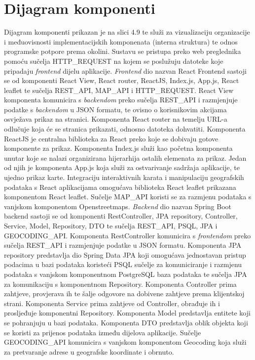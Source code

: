\eject
\section{Dijagram komponenti}

Dijagram komponenti prikazan je na slici 4.9 te služi za vizualizaciju organizacije i međuovisnosti implementacijskih
komponenata (interna struktura) te odnos programske potpore prema okolini. Sustavu se pristupa preko web preglednika pomoću sučelja HTTP\_REQUEST
na kojem se poslužuju datoteke koje pripadaju \textit{frontend} dijelu aplikacije. \textit{Frontend} dio nazvan React Frontend
sastoji se od komponenti React View, React router, ReactJS, Index.js, App.js, React leaflet te sučelja REST\_API, MAP\_API i HTTP\_REQUEST.
React View komponenta komunicira s \textit{backendom} preko sučelja REST\_API i razmjenjuje podatke s \textit{backendom} u
JSON formatu, te ovisno o korisnikovim akcijama osvježava prikaz na stranici. Komponenta React router na temelju URL-a
odlučuje koja će se stranica prikazati, odnosno datoteka dohvatiti. Komponenta ReactJS je centralna biblioteka za React
preko koje se dobivaju gotove komponente za prikaz. Komponenta Index.js služi kao početna komponenta unutar koje se nalazi
organizirana hijerarhija ostalih elemenata za prikaz. Jedan od njih je komponenta App.js koja služi za ostvarivanje
sadržaja aplikacije, te ujedno prikaz karte. Integraciju interaktivnih karata i manipulaciju geografskih podataka s React aplikacijama omogućava biblioteka
React leaflet prikazana komponentom React leaflet. Sučelje MAP\_API koristi se za razmjenu podataka s vanjskom komponentom
Openstreetmaps. \textit{Backend} dio nazvan Spring Boot backend sastoji se od komponenti RestController, JPA repository,
Controller, Service, Model, Repository, DTO te sučelja REST\_API, PSQL, JPA i GEOCODING\_API. Komponenta RestController komunicira
s \textit{frontendom} preko sučelja REST\_API i razmjenjuje podatke u JSON formatu. Komponenta JPA repository predstavlja
dio Spring Data JPA koji omogućava jednostavan pristup podacima u bazi podataka koristeći PSQL sučelje za komuniciranje i
razmjenu podataka s vanjskom komponentnom PostgreSQL baza podataka te sučelja JPA za komunikaciju s komponentnom Repository.
Komponenta Controller prima zahtjeve, provjerava ih te šalje odgovore na dobivene zahtjeve prema klijentskoj strani. Komponenta
Service prima zahtjeve od Controller, obrađuje ih i prosljeđuje komponentni Repository. Komponenta Model predstavlja entitete
koji se pohranjuju u bazi podataka. Komponenta DTO predstavlja oblik objekta koji se koristi za prijenos podataka između
dijelova aplikacije. Sučelje GEOCODING\_API komunicira s vanjskom komponentom Geocoding koja služi za pretvaranje adrese
u geografske koordinate i obrnuto.


